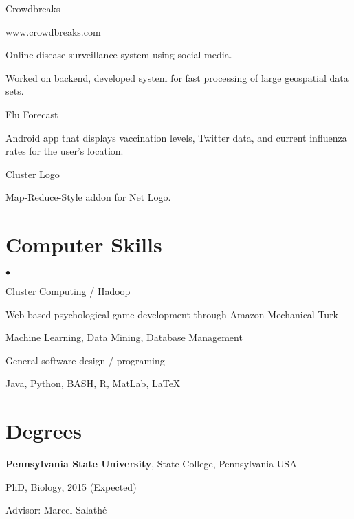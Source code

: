 \documentclass[margin,line]{res}
\newcommand{\linkToUrl}[1]{{\color{blue}\underline{\href{#1}{Link}}}}
\renewcommand{\linkToUrl}[1]{}
\newenvironment{list1}{
  \begin{list}{\ding{113}}{%
      \setlength{\itemsep}{0in}
      \setlength{\parsep}{0in} \setlength{\parskip}{0in}
      \setlength{\topsep}{0in} \setlength{\partopsep}{0in} 
      \setlength{\leftmargin}{0.17in}}}{\end{list}}
\newenvironment{list2}{
  \begin{list}{$\bullet$}{%
      \setlength{\itemsep}{0in}
      \setlength{\parsep}{0in} \setlength{\parskip}{0in}
      \setlength{\topsep}{0in} \setlength{\partopsep}{0in} 
      \setlength{\leftmargin}{10pt}}}{\end{list}}
\begin{document}
\begin{resume}
Crowdbreaks%
\begin{list1}
\item[] www.crowdbreaks.com
\item[] Online disease surveillance system using social media.
\item[] Worked on backend, developed system for fast processing of large geospatial data sets.
\end{list1}

Flu Forecast
\begin{list1}
\item[] Android app that displays vaccination levels, Twitter data, and current influenza rates for the user's location.
\end{list1}

Cluster Logo \linkToUrl{http://bit.ly/12UQ4cq}
\begin{list1}
\item[] Map-Reduce-Style addon for Net Logo.
\end{list1}

\section{\sc Computer Skills} 
\begin{list2}
\item Cluster Computing / Hadoop 
\item Web based psychological game development through Amazon Mechanical Turk
\item Machine Learning, Data Mining, Database Management
\item General software design / programing
\item Java, Python, BASH, R, MatLab, \LaTeX
\end{list2}

\newpage

\section{\sc Degrees}
{\bf Pennsylvania State University}, State College, Pennsylvania USA\\
\vspace*{-.1in}
\begin{list1}
\item[] PhD, Biology, 2015 (Expected)
\item[] Advisor: Marcel Salath\'e
\end{list1}




\end{resume}
\end{document}
